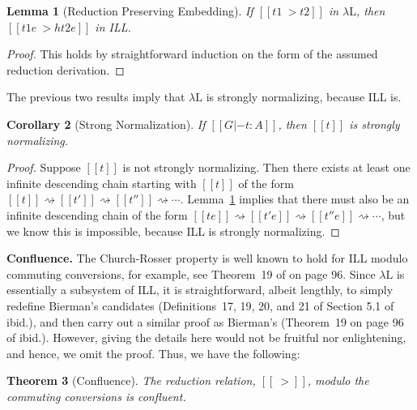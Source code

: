 \documentclass{article}
\newcommand{\redto}{\rightsquigarrow}
\newtheorem{theorem}{Theorem}
\newtheorem{lemma}[theorem]{Lemma}
\newtheorem{corollary}[theorem]{Corollary}
\begin{document}
\begin{lemma}[Reduction Preserving Embedding]
  \label{lemma:reduction_preserving_embedding}
  If $[[t1 ~> t2]]$ in $\lambda\text{L}$, then $[[t1 e ~> h{t2 e}]]$
  in ILL.
\end{lemma}
\begin{proof}
  This holds by straightforward induction on the form of the assumed
  reduction derivation.
\end{proof}
\noindent
The previous two results imply that $\lambda\text{L}$ is strongly
normalizing, because ILL is.
\begin{corollary}[Strong Normalization]
  \label{corollary:strong_normalization}
  If $[[G |- t : A]]$, then $[[t]]$ is strongly normalizing.
\end{corollary}
\begin{proof}
  Suppose $[[t]]$ is not strongly normalizing.  Then there exists at
  least one infinite descending chain starting with $[[t]]$ of the
  form $[[t]] \redto [[t']] \redto [[t'']] \redto
  \cdots$. Lemma~\ref{lemma:reduction_preserving_embedding} implies
  that there must also be an infinite descending chain of the form
  $[[t e]] \redto [[t' e]] \redto [[t'' e]] \redto \cdots$, but we
  know this is impossible, because ILL is strongly normalizing.
\end{proof}

\textbf{Confluence.} The Church-Rosser property is well known to hold
for ILL modulo commuting conversions, for example, see Theorem~19 of
\cite{Bierman:1994} on page 96.  Since $\lambda\text{L}$ is
essentially a subsystem of ILL, it is straightforward, albeit
lengthly, to simply redefine Bierman's candidates (Definitions~17, 19,
20, and 21 of Section 5.1 of ibid.), and then carry out a similar proof
as Bierman's (Theorem~19 on page 96 of ibid.).  However, giving the
details here would not be fruitful nor enlightening, and hence, we
omit the proof.  Thus, we have the following:
\begin{theorem}[Confluence]
  \label{thm:confluence}
  The reduction relation, $[[~>]]$, modulo the commuting conversions
  is confluent.
\end{theorem}
\end{document}
